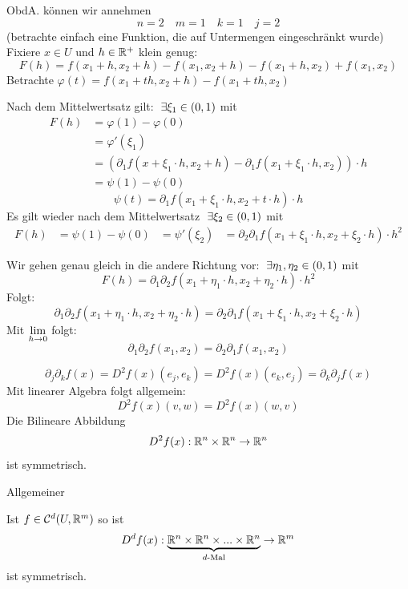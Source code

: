 \documentclass[main.tex]{subfiles}
\begin{document}
\begin{Beweis}
  ObdA. können wir annehmen
  $$n = 2 \quad m=1 \quad k = 1 \quad j = 2$$
  (betrachte einfach eine Funktion, die auf Untermengen eingeschränkt wurde)
  Fixiere $x \in U$ und $h \in \mathbb{R}^+$ klein genug:
  $$F(h) = f(x_1 + h, x_2 + h) - f(x_1, x_2 + h) - f(x_1 + h, x_2) + f(x_1, x_2)$$
  Betrachte $\varphi(t) = f(x_1+th,x_2+h) - f(x_1+th, x_2)$

  Nach dem Mittelwertsatz gilt: $\;\exists \xi_1 \in (0,1)$ mit
  $$\begin{aligned}
    F(h) & = \varphi(1) - \varphi(0) \\
    & = \varphi'(\xi_1) \\
    & = (\partial_1  f(x + \xi_1 \cdot h, x_2 + h) - \partial_1 f(x_1 + \xi_1 \cdot h, x_2)) \cdot h \\
    & = \psi(1) - \psi(0)
  \end{aligned}$$
  $$\psi(t) = \partial_1 f(x_1 + \xi_1 \cdot h, x_2 + t \cdot h)\cdot h$$
  Es gilt wieder nach dem Mittelwertsatz $\;\exists \xi_2 \in (0,1)$ mit
  $$\begin{aligned}
    F(h) & = \psi(1) - \psi(0)
    & = \psi'(\xi_2)
    & = \partial_2 \partial_1 f(x_1 + \xi_1 \cdot h, x_2 + \xi_2 \cdot h) \cdot h^2
  \end{aligned}$$

  Wir gehen genau gleich in die andere Richtung vor: $\;\exists \eta_1, \eta_2 \in (0,1)$ mit
  $$F(h) = \partial_1 \partial_2 f(x_1 + \eta_1 \cdot h, x_2 + \eta_2 \cdot h) \cdot h^2$$
  Folgt:
  $$\partial_1 \partial_2 f(x_1 + \eta_1 \cdot h, x_2 + \eta_2 \cdot h)  = \partial_2 \partial_1 f(x_1 + \xi_1 \cdot h, x_2 + \xi_2 \cdot h)$$
  Mit $\lim \limits_{h \to 0}$ folgt:
  $$\partial_1 \partial_2 f(x_1, x_2) = \partial_2 \partial_1 f(x_1, x_2)$$
\end{Beweis}

\begin{Bemerkung}[Reformulierung]
  $$\partial_j \partial_k f(x) = D^2f(x)(e_j, e_k) = D^2f(x)(e_k, e_j) = \partial_k \partial_j f(x)$$
  Mit linearer Algebra folgt allgemein:
  $$ D^2f(x)(v, w) =  D^2f(x)(w, v)$$
  Die Bilineare Abbildung
  $$D^2f(x) : \mathbb{R}^n \times \mathbb{R}^n \to \mathbb{R}^n$$
  ist symmetrisch.
\end{Bemerkung}

Allgemeiner
\begin{Theorem}
  Ist $f \in \mathcal{C}^d(U,\mathbb{R}^m)$ so ist
  $$D^df(x): \underbrace{\mathbb{R}^n \times \mathbb{R}^n \times ... \times \mathbb{R}^n}_{d\text{-Mal}} \to \mathbb{R}^m$$
  ist symmetrisch.
\end{Theorem}
\end{document}
